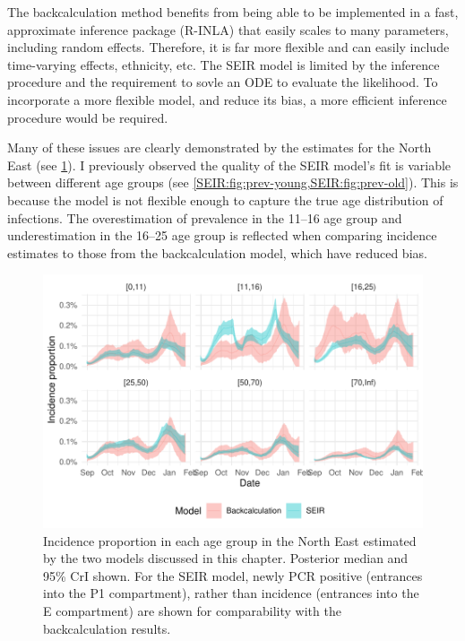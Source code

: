 \documentclass[thesis.tex]{subfiles}
\begin{document}
The backcalculation method benefits from being able to be implemented in a fast, approximate inference package (R-INLA) that easily scales to many parameters, including random effects.
Therefore, it is far more flexible and can easily include time-varying effects, ethnicity, etc.
The SEIR model is limited by the inference procedure and the requirement to sovle an ODE to evaluate the likelihood.
To incorporate a more flexible model, and reduce its bias, a more efficient inference procedure would be required.

Many of these issues are clearly demonstrated by the estimates for the North East (see \cref{transmission:fig:compare-NE}).
I previously observed the quality of the SEIR model's fit is variable between different age groups (see \cref{SEIR:fig:prev-young,SEIR:fig:prev-old}).
This is because the model is not flexible enough to capture the true age distribution of infections.
The overestimation of prevalence in the 11--16 age group and underestimation in the 16--25 age group is reflected when comparing incidence estimates to those from the backcalculation model, which have reduced bias.
\begin{figure}
    \centering \includegraphics{transmission/compare-NE}
    \caption[Comparing each models estimate of North East incidence by age.]{%
        Incidence proportion in each age group in the North East estimated by the two models discussed in this chapter.
        Posterior median and 95\% CrI shown.
        For the SEIR model, newly PCR positive (entrances into the P1 compartment), rather than incidence (entrances into the E compartment) are shown for comparability with the backcalculation results.
    }
    \label{transmission:fig:compare-NE}
\end{figure}
\end{document}
